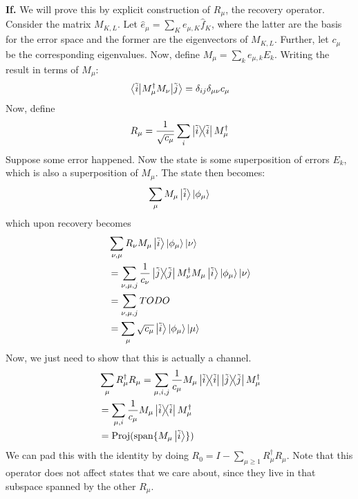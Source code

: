 \begin{theorem}
\begin{proof*}
        \textbf{If.} We will prove this by explicit construction of $R_{\mu}$, the recovery operator. Consider the matrix $M_{K, L}$.
        Let $\hat{e}_{\mu} = \sum_K e_{\mu, K} \hat{f}_K$, where the latter are the basis for the error space and the former
        are the eigenvectors of $M_{K, L}$. Further, let $c_{\mu}$ be the corresponding eigenvalues. Now, define $M_{\mu} = \sum_k e_{\mu, k} E_k$.
        Writing the result in terms of $M_{\mu}$:
        \begin{align*}
            \mel{\tilde{i}}{M_{\mu}^{\dagger} M_{\nu}}{\tilde{j}} = \delta_{ij} \delta_{\mu \nu} c_{\mu}
        \end{align*}
        Now, define
        \[ R_{\mu}  = \frac{1}{\sqrt{c_{\mu}}} \sum_i \ketbra{\tilde{i}} M_{\mu}^{\dagger} \]
        Suppose some error happened. Now the state is some superposition of errors $E_k$, which
        is also a superposition of $M_{\mu}$. The state then becomes:
        \[ \sum_{\mu} M_{\mu} \ket{\tilde{i}} \ket{\phi_{\mu}} \]
        which upon recovery becomes
        \begin{align*}
            &\sum_{\nu, \mu} R_{\nu} M_{\mu} \ket{\tilde{i}} \ket{\phi_{\mu}} \ket{\nu} \\
            &= \sum_{\nu, \mu, j} \frac{1}{c_{\nu}} \ketbra{\tilde{j}} M_{\nu}^{\dagger} M_{\mu} \ket{\tilde{i}} \ket{\phi_{\mu}} \ket{\nu} \\
            &= \sum_{\nu, \mu, j} TODO \\
            &= \sum_{\mu} \sqrt{c_{\mu}} \ket{\tilde{i}} \ket{\phi_{\mu}} \ket{\mu}
        \end{align*}
        Now, we just need to show that this is actually a channel.
        \begin{align*}
            &\sum_{\mu} R_{\mu}^{\dagger} R_{\mu}= \sum_{\mu, i, j} \frac{1}{c_{\mu}} M_\mu \ketbra{\tilde{i}} \ketbra{\tilde{j}} M_{\mu}^{\dagger} \\
            &= \sum_{\mu, i} \frac{1}{c_{\mu}} M_{\mu} \ketbra{\tilde{i}} M_{\mu}^{\dagger} \\
            &= \textrm{Proj}(\textrm{span}\{ M_{\mu} \ket{\tilde{i}}\})
        \end{align*}
        We can pad this with the identity by doing $R_0 = I - \sum_{\mu \geq 1} R_{\mu}^{\dagger} R_{\mu}$.
        Note that this operator does not affect states that we care about, since they live in that subspace spanned by the
        other $R_{\mu}$.
    \end{proof*}
\end{theorem}

